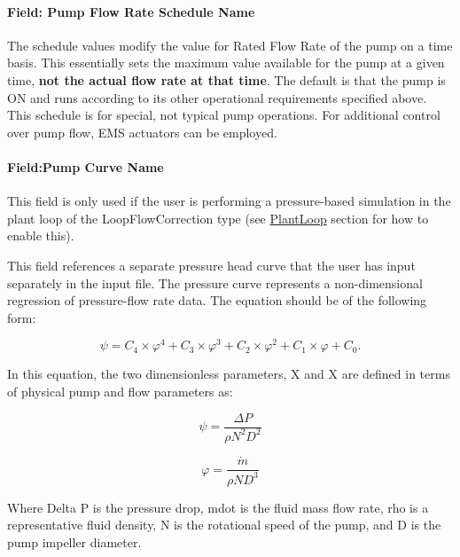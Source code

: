 \paragraph{Field: Pump Flow Rate Schedule Name}\label{field-pump-flow-rate-schedule-name-1}

The schedule values modify the value for Rated Flow Rate of the pump on a time basis. This essentially sets the maximum value available for the pump at a given time, \textbf{not the actual flow rate at that time}. The default is that the pump is ON and runs according to its other operational requirements specified above. This schedule is for special, not typical pump operations. For additional control over pump flow, EMS actuators can be employed.

\paragraph{Field:Pump Curve Name}\label{fieldpump-curve-name}

This field is only used if the user is performing a pressure-based simulation in the plant loop of the LoopFlowCorrection type (see \hyperref[plantloop]{PlantLoop} section for how to enable this).

This field references a separate pressure head curve that the user has input separately in the input file. The pressure curve represents a non-dimensional regression of pressure-flow rate data. The equation should be of the following form:

\begin{equation}
\psi  = {C_4} \times {\varphi ^4} + {C_3} \times {\varphi ^3} + {C_2} \times {\varphi ^2} + {C_1} \times \varphi  + {C_0}.
\end{equation}

In this equation, the two dimensionless parameters, X and X are defined in terms of physical pump and flow parameters as:

\begin{equation}
\psi  = \frac{{\Delta P}}{{\rho {N^2}{D^2}}}
\end{equation}

\begin{equation}
\varphi  = \frac{{\dot m}}{{\rho N{D^3}}}
\end{equation}

Where Delta P is the pressure drop, mdot is the fluid mass flow rate, rho is a representative fluid density, N is the rotational speed of the pump, and D is the pump impeller diameter.

